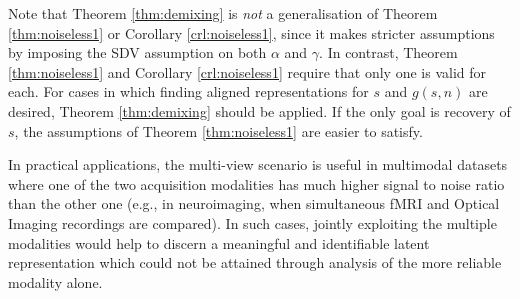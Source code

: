 Note that Theorem \ref{thm:demixing} is \emph{not} a generalisation of Theorem \ref{thm:noiseless1} or Corollary \ref{crl:noiseless1}, since it makes stricter assumptions by imposing the SDV assumption on both ${\alpha}$ and ${\gamma}$.
In contrast, Theorem \ref{thm:noiseless1} and Corollary \ref{crl:noiseless1} require that only one is valid for each.
For cases in which finding aligned representations for ${s}$ and ${g}({s}, {n})$ are desired, Theorem \ref{thm:demixing} should be applied.
If the only goal is recovery of ${s}$, the assumptions of Theorem \ref{thm:noiseless1} are easier to satisfy.


In practical applications, the multi-view scenario is useful in multimodal datasets where one of the two acquisition modalities has much higher signal to noise ratio than the other one (e.g., in neuroimaging, when simultaneous fMRI and Optical Imaging recordings are compared). In such cases, jointly exploiting the multiple modalities would help to discern a meaningful and identifiable latent representation which could not be attained through analysis of the more reliable modality alone.




